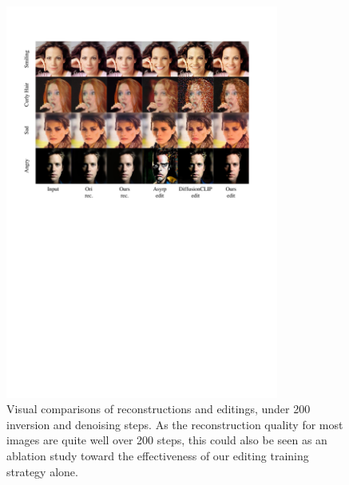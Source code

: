 \documentclass[letterpaper]{article} %
\begin{document}
\begin{figure}[t]
    \centering
    \includegraphics[width=0.8\textwidth]{Figs/fig12.pdf}
    \caption{Visual comparisons of reconstructions and editings, under 200 inversion and denoising steps. As the reconstruction quality for most images are quite well over 200 steps, this could also be seen as an ablation study toward the effectiveness of our editing training strategy alone.}
    \label{fig13}
\end{figure}
\end{document}
